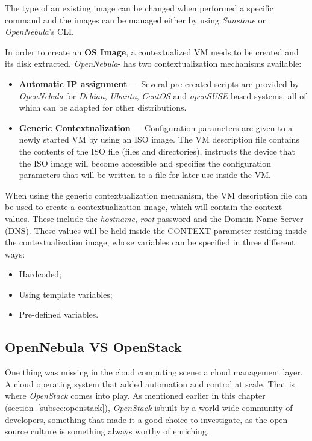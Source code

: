 The type of an existing image can be changed when performed a specific command and the images can be managed either by using \textit{Sunstone} or \textit{OpenNebula}'s CLI.

In order to create an \textbf{OS Image}, a contextualized VM needs to be created and its disk extracted.
\textit{OpenNebula}- has two contextualization mechanisms available:

\begin{itemize}
\item \textbf{Automatic IP assignment} --- Several pre-created scripts are provided by \textit{OpenNebula} for \textit{Debian}, \textit{Ubuntu}, \textit{CentOS} and \textit{openSUSE} based systems, all of which can be adapted for other distributions.
\item \textbf{Generic Contextualization} --- Configuration parameters are given to a newly started VM by using an ISO image. The VM description file contains the contents of the ISO file (files and directories), instructs the device that the ISO image will become accessible and specifies the configuration parameters that will be written to a file for later use inside the VM.
\end{itemize}

When using the generic contextualization mechanism, the VM description file can be used to create a contextualization image, which will contain the context values. These include the \textit{hostname}, \textit{root} password and the Domain Name Server (DNS). These values will be held inside the CONTEXT parameter residing inside the contextualization image, whose variables can be specified in three different ways:

\begin{itemize}
\item Hardcoded;
\item Using template variables;
\item Pre-defined variables.~\cite{nebula-contextualization}
\end{itemize}

\subsection{OpenNebula VS OpenStack}\label{subsec:nebula-vs-stack}

One thing was missing in the cloud computing scene: a cloud management layer. A cloud operating system that added automation and control at scale. That is where \textit{OpenStack} comes into play. As mentioned earlier in this chapter (section~\ref{subsec:openstack}), \textit{OpenStack} isbuilt by a world wide community of developers, something that made it a good choice to investigate, as the open source culture is something always worthy of enriching.~\cite{stackgithub}

